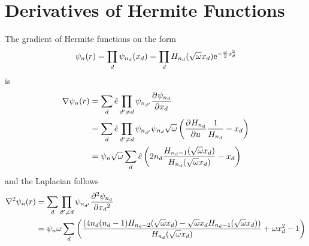 \section{Derivatives of Hermite Functions}
    The gradient of Hermite functions on the form
        \begin{equation}
            \psi_n(r) = \prod_d \psi_{n_d}(x_d) = \prod_d
            H_{n_d}(\sqrt{\omega}x_d)\mathrm{e}^{-\frac{\omega}{2}x^2_d}
        \end{equation}
    is
        \begin{align}
            \nabla \psi_n(r) &= \sum_d\hat{e} \prod_{d'\neq d} \psi_{n_{d'}}
            \prd{x_d}[\psi_{n_d}] \nonumber \\
            &= \sum_d\hat{e} \prod_{d'\neq d} \psi_{n_{d'}} \psi_{n_d}
            \sqrt{\omega} \left(\prd{u}[H_{n_d}]\frac{1}{H_{n_d}} - x_d\right)
            \nonumber \\
            &= \psi_n\sqrt{\omega}\sum_d \hat{e}
            \left(2n_d\frac{H_{n_d-1}(\sqrt{\omega}x_d)}
            {H_{n_d}(\sqrt{\omega}x_d)} - x_d\right)
        \end{align}
    and the Laplacian follows
        \begin{align}
            \nabla^2 \psi_n(r) &= \sum_d \prod_{d'\neq d} \psi_{n_{d'}}
            \prd{x_d}[\psi_{n_d}][2] \nonumber \\
            &= \psi_n\omega\sum_d
            \left(\frac{\left(4n_d(n_d-1)H_{n_d-2}(\sqrt{\omega}x_d) -
            \sqrt{\omega}x_dH_{n_d-1}(\sqrt{\omega}x_d)\right)}
            {H_{n_d}(\sqrt{\omega}x_d)} + \omega x^2_d - 1\right)
        \end{align}

